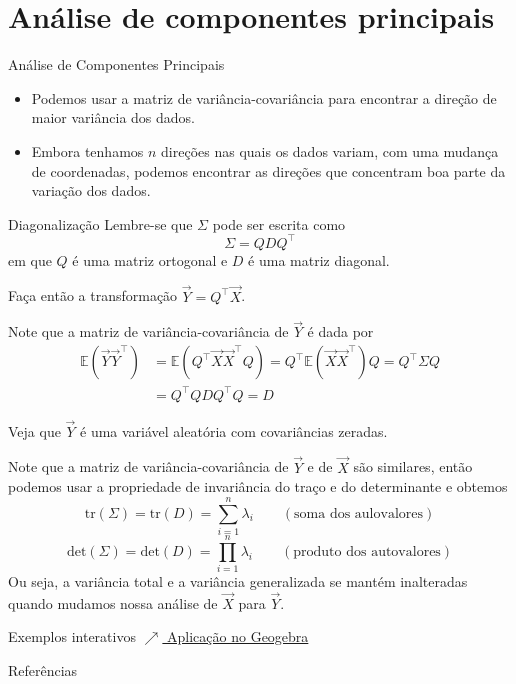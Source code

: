 \documentclass[
  ignorenonframetext,
  aspectratio=169,
]{beamer}
\newcommand{\EE}{\mathbb{E}}
\newcommand{\vX}{\vec{X}}
\newcommand{\vY}{\vec{Y}}
\begin{document}
\section{Análise de componentes principais}


\begin{frame}{Análise de Componentes Principais}
  \begin{itemize}
    \item Podemos usar a matriz de variância-covariância para encontrar a direção de maior variância dos dados.
    \item Embora tenhamos $n$ direções nas quais os dados variam, com uma mudança de coordenadas, podemos encontrar as direções que concentram boa parte da variação dos dados.
  \end{itemize}
\end{frame}

\begin{frame}{Diagonalização}
  Lembre-se que $\Sigma$ pode ser escrita como
  \[\Sigma = QDQ^\top\]
  em que $Q$ é uma matriz ortogonal e $D$ é uma matriz diagonal.

  Faça então a transformação $\vY = Q^\top\vX$.
\end{frame}
\begin{frame}
  
  Note que a matriz de variância-covariância de $\vY$ é dada por 
  \begin{align*}
    \EE(\vY\vY^\top) &= \EE(Q^\top\vX\vX^\top Q) = Q^\top\EE(\vX\vX^\top)Q = Q^\top\Sigma Q \\
    &= Q^\top QDQ^\top Q = D
  \end{align*}

  Veja que $\vY$ é uma variável aleatória com covariâncias zeradas.  
  
\end{frame}

\begin{frame}
  Note que a matriz de variância-covariância de $\vY$ e de $\vX$ são similares, então podemos usar a propriedade de invariância do traço e do determinante e obtemos
  \[\text{tr}(\Sigma) = \text{tr}(D) = \sum_{i=1}^n \lambda_i \qquad (\text{soma dos aulovalores})\]
  \[\text{det}(\Sigma) = \text{det}(D) = \prod_{i=1}^n \lambda_i \qquad (\text{produto dos autovalores})\]
  Ou seja, a variância total e a variância generalizada se mantém inalteradas quando mudamos nossa análise de $\vX$ para $\vY$.
\end{frame}
 
\begin{frame}{Exemplos interativos}
  \href{https://www.geogebra.org/m/vsn2qpec}{$\nearrow$ Aplicação no Geogebra}
\end{frame}
\begin{frame}{Referências}
  

\nocite{sirjaev_probability_1996}
\nocite{JohnsonWichern2007}
\end{frame}
\end{document}
